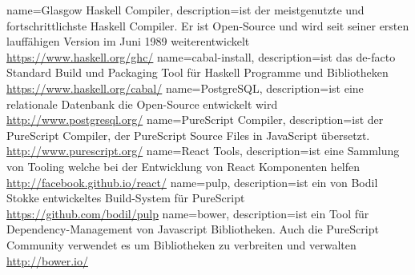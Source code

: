 {
  name=Glasgow Haskell Compiler,
  description={ist der meistgenutzte und fortschrittlichste Haskell Compiler.
    Er ist Open-Source und wird seit seiner ersten lauffähigen Version im Juni 1989 weiterentwickelt\\
    \url{https://www.haskell.org/ghc/}
  }
}
{
  name=cabal-install,
  description={ist das de-facto Standard Build und Packaging Tool für Haskell Programme und Bibliotheken\\
    \url{https://www.haskell.org/cabal/}
  }
}
{
  name=PostgreSQL,
  description={ist eine relationale Datenbank die Open-Source entwickelt wird\\
    \url{http://www.postgresql.org/}
  }
}
{
  name=PureScript Compiler,
  description={ist der PureScript Compiler, der PureScript Source Files in JavaScript übersetzt.\\
    \url{http://www.purescript.org/}
  }
}
{
  name=React Tools,
  description={ist eine Sammlung von Tooling welche bei der Entwicklung von React Komponenten helfen\\
    \url{http://facebook.github.io/react/}
  }
}
{
  name=pulp,
  description={ist ein von Bodil Stokke entwickeltes Build-System für PureScript\\
    \url{https://github.com/bodil/pulp}
  }
}
{
  name=bower,
  description={ist ein Tool für Dependency-Management von Javascript Bibliotheken. Auch die PureScript Community
    verwendet es um Bibliotheken zu verbreiten und verwalten\\
    \url{http://bower.io/}
  }
}

